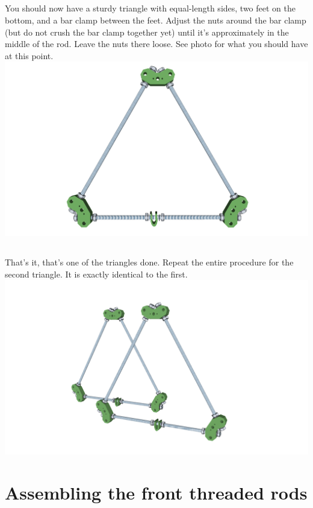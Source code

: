 \documentclass[twoside,a4paper,titlepage]{memoir}
\begin{document}
	\section{}
	You should now have a sturdy triangle with equal-length sides, two feet on the bottom, and a bar clamp
	between the feet. Adjust the nuts around the bar clamp (but do not crush the bar clamp together yet)
	until it's approximately in the middle of the rod. Leave the nuts there loose. See photo for what you
	should have at this point. \\
	\includegraphics[width=1\linewidth]{graphics/ch1_13.png}
	
	\section{}
	That's it, that's one of the triangles done. Repeat the entire procedure for the second triangle. It is
	exactly identical to the first. \\
	\includegraphics[width=1\linewidth]{graphics/ch1_14.png}
	
	\chapter{Assembling the front threaded rods}
\end{document}
